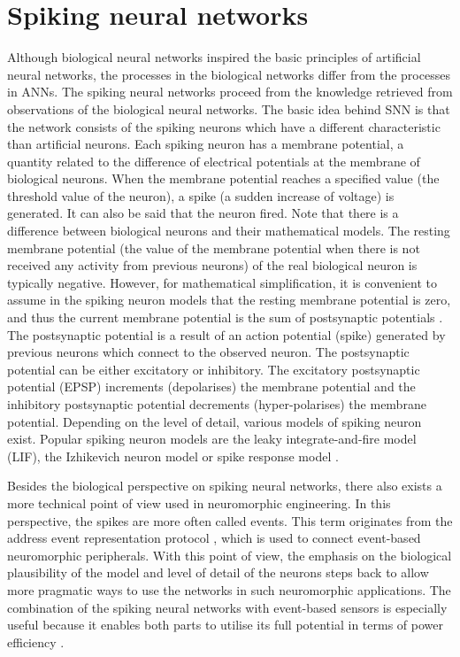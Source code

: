 \section{Spiking neural networks}
Although biological neural networks inspired the basic principles of artificial neural networks, the processes in the biological networks differ from the processes in ANNs. The spiking neural networks proceed from the knowledge retrieved from observations of the biological neural networks. The basic idea behind SNN is that the network consists of the spiking neurons which have a different characteristic than artificial neurons. Each spiking neuron has a membrane potential, a quantity related to the difference of electrical potentials at the membrane of biological neurons. When the membrane potential reaches a specified value (the threshold value of the neuron), a spike (a sudden increase of voltage) is generated. It can also be said that the neuron fired. Note that there is a difference between biological neurons and their mathematical models. The resting membrane potential (the value of the membrane potential when there is not received any activity from previous neurons) of the real biological neuron is typically negative. However, for mathematical simplification, it is convenient to assume in the spiking neuron models that the resting membrane potential is zero, and thus the current membrane potential is the sum of postsynaptic potentials \cite{maassNetworksSpikingNeurons1997}. The postsynaptic potential is a result of an action potential (spike) generated by previous neurons which connect to the observed neuron. The postsynaptic potential can be either excitatory or inhibitory. The excitatory postsynaptic potential (EPSP) increments (depolarises) the membrane potential and the inhibitory postsynaptic potential decrements (hyper-polarises) the membrane potential. Depending on the level of detail, various models of spiking neuron exist. Popular spiking neuron models are the leaky integrate-and-fire model (LIF), the Izhikevich neuron model or spike response model \cite{tavanaeiDeepLearningSpiking2019}. \par
Besides the biological perspective on spiking neural networks, there also exists a more technical point of view used in neuromorphic engineering. In this perspective, the spikes are more often called events. This term originates from the address event representation protocol \cite{pazTestInfrastructureAddressEventRepresentation2005, boahenPointtopointConnectivity00}, which is used to connect event-based neuromorphic peripherals. With this point of view, the emphasis on the biological plausibility of the model and level of detail of the neurons steps back to allow more pragmatic ways to use the networks in such neuromorphic applications. The combination of the spiking neural networks with event-based sensors is especially useful because it enables both parts to utilise its full potential in terms of power efficiency \cite{pfeifferDeepLearningSpiking2018}.

